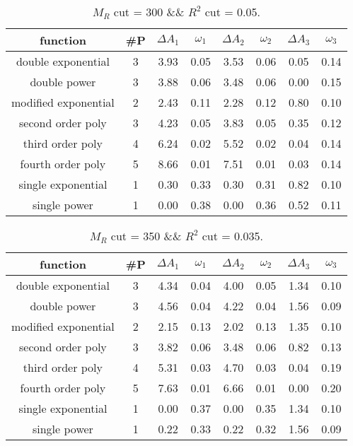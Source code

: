  
\begin{table}[H] 
\begin{center} 
\begin{tabular}{|c|c|cc|cc|cc|} 
\hline function & \#P & $\Delta A_1$ & $\omega_1$ & $\Delta A_2$ & $\omega_2$ & $\Delta A_3$ & $\omega_3$ \\ \hline 
double exponential &  3 &   3.93 &   0.05 &   3.53 &   0.06 &   0.05 &   0.14 \\ 
double power &  3 &   3.88 &   0.06 &   3.48 &   0.06 &   0.00 &   0.15 \\ 
modified exponential &  2 &   2.43 &   0.11 &   2.28 &   0.12 &   0.80 &   0.10 \\ 
second order poly &  3 &   4.23 &   0.05 &   3.83 &   0.05 &   0.35 &   0.12 \\ 
third order poly &  4 &   6.24 &   0.02 &   5.52 &   0.02 &   0.04 &   0.14 \\ 
fourth order poly &  5 &   8.66 &   0.01 &   7.51 &   0.01 &   0.03 &   0.14 \\ 
single exponential &  1 &   0.30 &   0.33 &   0.30 &   0.31 &   0.82 &   0.10 \\ 
single power &  1 &   0.00 &   0.38 &   0.00 &   0.36 &   0.52 &   0.11 \\ 
\hline 
\end{tabular} 
\caption{$M_R$ cut = 300 \&\& $R^2$ cut = 0.05.} 
\label{tab:FitChoices_300_0.05} 
\end{center} 
\end{table} 
 
 
\begin{table}[H] 
\begin{center} 
\begin{tabular}{|c|c|cc|cc|cc|} 
\hline function & \#P & $\Delta A_1$ & $\omega_1$ & $\Delta A_2$ & $\omega_2$ & $\Delta A_3$ & $\omega_3$ \\ \hline 
double exponential &  3 &   4.34 &   0.04 &   4.00 &   0.05 &   1.34 &   0.10 \\ 
double power &  3 &   4.56 &   0.04 &   4.22 &   0.04 &   1.56 &   0.09 \\ 
modified exponential &  2 &   2.15 &   0.13 &   2.02 &   0.13 &   1.35 &   0.10 \\ 
second order poly &  3 &   3.82 &   0.06 &   3.48 &   0.06 &   0.82 &   0.13 \\ 
third order poly &  4 &   5.31 &   0.03 &   4.70 &   0.03 &   0.04 &   0.19 \\ 
fourth order poly &  5 &   7.63 &   0.01 &   6.66 &   0.01 &   0.00 &   0.20 \\ 
single exponential &  1 &   0.00 &   0.37 &   0.00 &   0.35 &   1.34 &   0.10 \\ 
single power &  1 &   0.22 &   0.33 &   0.22 &   0.32 &   1.56 &   0.09 \\ 
\hline 
\end{tabular} 
\caption{$M_R$ cut = 350 \&\& $R^2$ cut = 0.035.} 
\label{tab:FitChoices_350_0.035} 
\end{center} 
\end{table} 
 
